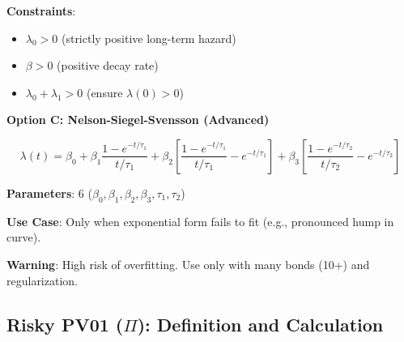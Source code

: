 \documentclass[11pt,a4paper]{article}
\begin{document}
\textbf{Constraints}:
\begin{itemize}
    \item $\lambda_0 > 0$ (strictly positive long-term hazard)
    \item $\beta > 0$ (positive decay rate)
    \item $\lambda_0 + \lambda_1 > 0$ (ensure $\lambda(0) > 0$)
\end{itemize}

\vspace{0.5cm}

\textbf{Option C: Nelson-Siegel-Svensson (Advanced)}

\begin{equation}
\lambda(t) = \beta_0 + \beta_1 \frac{1-e^{-t/\tau_1}}{t/\tau_1} + \beta_2\left[\frac{1-e^{-t/\tau_1}}{t/\tau_1} - e^{-t/\tau_1}\right] + \beta_3\left[\frac{1-e^{-t/\tau_2}}{t/\tau_2} - e^{-t/\tau_2}\right]
\end{equation}

\textbf{Parameters}: 6 ($\beta_0, \beta_1, \beta_2, \beta_3, \tau_1, \tau_2$)

\textbf{Use Case}: Only when exponential form fails to fit (e.g., pronounced hump in curve).

\textbf{Warning}: High risk of overfitting. Use only with many bonds (10+) and regularization.

\subsection{Risky PV01 ($\Pi$): Definition and Calculation}
\end{document}
